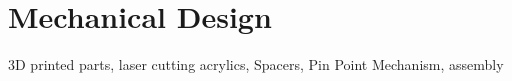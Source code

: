 
\chapter{Mechanical Design}
3D printed parts, laser cutting acrylics, Spacers, Pin Point Mechanism, assembly
